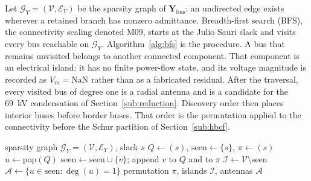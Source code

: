 Let $\mathcal{G}_Y=(\mathcal{V},\mathcal{E}_Y)$ be the sparsity graph of $\mathbf{Y}_{\mathrm{bus}}$: an undirected edge exists wherever a retained branch has nonzero admittance. Breadth-first search (BFS), the connectivity scaling denoted M09, starts at the Julio Sauri slack and visits every bus reachable on $\mathcal{G}_Y$. Algorithm~\ref{alg:bfs} is the procedure. A bus that remains unvisited belongs to another connected component. That component is an electrical island: it has no finite power-flow state, and its voltage magnitude is recorded as $V_m=\mathrm{NaN}$ rather than as a fabricated residual. After the traversal, every visited bus of degree one is a radial antenna and is a candidate for the 69~kV condensation of Section~\ref{sub:reduction}. Discovery order then places interior buses before border buses. That order is the permutation applied to the connectivity before the Schur partition of Section~\ref{sub:hbcf}.

\begin{algorithm}[!t]
\caption{Breadth-first scaling on the admittance graph (M09)}
\label{alg:bfs}
\begin{algorithmic}[1]
\Require sparsity graph $\mathcal{G}_Y=(\mathcal{V},\mathcal{E}_Y)$, slack $s$
\State $Q \gets (s)$, $\mathrm{seen}\gets\{s\}$, $\pi\gets(s)$
  \State $u \gets \mathrm{pop}(Q)$
      \State $\mathrm{seen}\gets\mathrm{seen}\cup\{v\}$; append $v$ to $Q$ and to $\pi$
    \EndIf
  \EndFor
\EndWhile
\State $\mathcal{I}\gets\mathcal{V}\setminus\mathrm{seen}$ 
\State $\mathcal{A}\gets\{u\in\mathrm{seen}:\deg(u)=1\}$ 
\State \Return permutation $\pi$, islands $\mathcal{I}$, antennas $\mathcal{A}$
\end{algorithmic}
\end{algorithm}

